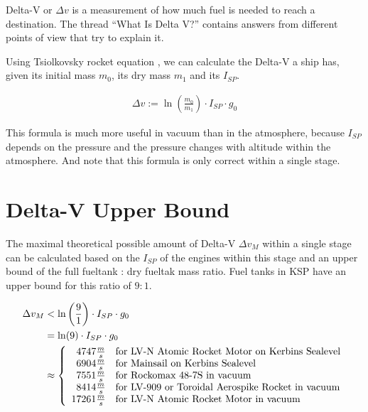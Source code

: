 \documentclass[11pt]{report}
\newcommand{\dv}{{\Delta}{v}}
\newcommand{\isp}{I_{SP}}
\begin{document}
Delta-V or $\dv$  \cite{DeltaV} is a measurement of how
much fuel is needed to reach a destination. The thread ``What Is Delta
V?''  \cite{WhatIsDeltaV} contains answers from different points of
view that try to explain it.

Using Tsiolkovsky rocket equation \cite{TsiolkovskyRocketEquation},
\cite{TsiolkovskyKSP} we can calculate the Delta-V a ship has, given
its initial mass $m_0$, its dry mass $m_1$ and its $\isp$.

\begin{align}
\dv := \ln\left(\frac{m_0}{m_1}\right) \cdot \isp \cdot g_0\label{TsiolkovskyEquation}
\end{align}

This formula is much more useful in vacuum than in the atmosphere,
because $\isp$ depends on the pressure and the pressure changes with
altitude within the atmosphere. And note that this formula is only
correct within a single stage.

\section{Delta-V Upper Bound}

The maximal theoretical possible amount of Delta-V $\dv_M$ within a
single stage can be calculated based on the $\isp$ of the engines
within this stage and an upper bound of the full fueltank : dry
fueltak mass ratio. Fuel tanks in KSP have an upper bound for this
ratio of $9:1$.

\begin{align}
  \dv_M & < \ln\left(\frac{9}{1}\right) \cdot \isp \cdot g_0\nonumber\\
  & = \ln(9) \cdot \isp \cdot g_0\nonumber\\
  & \approx \left\{
    \begin{array}{r l}
      4747 \frac{m}{s} & \textrm{for LV-N Atomic Rocket Motor on Kerbins Sealevel}\\
      6904 \frac{m}{s} & \textrm{for Mainsail on Kerbins Sealevel}\\
      7551 \frac{m}{s} & \textrm{for Rockomax 48-7S in vacuum}\\
      8414 \frac{m}{s} & \textrm{for LV-909 or Toroidal Aerospike Rocket in vacuum}\\
      17261 \frac{m}{s} & \textrm{for LV-N Atomic Rocket Motor in vacuum}
    \end{array}
  \right.
\end{align}
\end{document}
